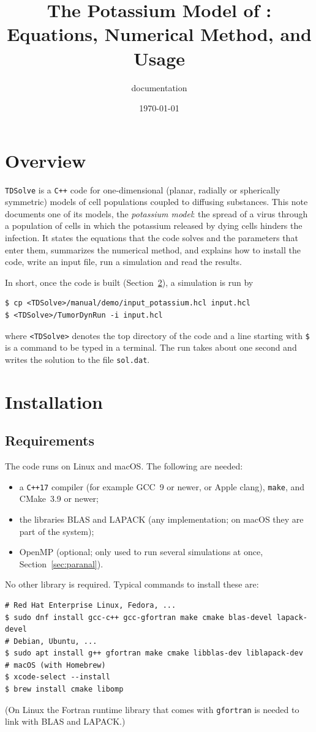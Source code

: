 \documentclass[11pt]{article}
\title{The Potassium Model of \code{TDSolve}:\\ Equations, Numerical Method, and Usage}
\author{\code{TDSolve} documentation}
\date{\today}
\newcommand{\code}[1]{\texttt{#1}}
\begin{document}
\maketitle

\section{Overview}
\code{TDSolve} is a \code{C++} code for one-dimensional (planar, radially or spherically symmetric) models of cell populations coupled to diffusing substances.
This note documents one of its models, the \emph{potassium model}: the spread of a virus through a population of cells in which the potassium released by dying cells hinders the infection.
It states the equations that the code solves and the parameters that enter them, summarizes the numerical method, and explains how to install the code, write an input file, run a simulation and read the results.

In short, once the code is built (Section~\ref{sec:install}), a simulation is run by
\begin{lstlisting}
$ cp <TDSolve>/manual/demo/input_potassium.hcl input.hcl
$ <TDSolve>/TumorDynRun -i input.hcl
\end{lstlisting}
where \code{<TDSolve>} denotes the top directory of the code and a line starting with \code{\$} is a command to be typed in a terminal.
The run takes about one second and writes the solution to the file \code{sol.dat}.

\section{Installation}
\label{sec:install}

\subsection{Requirements}
The code runs on Linux and macOS. The following are needed:
\begin{itemize}
  \item a \code{C++17} compiler (for example GCC~9 or newer, or Apple clang), \code{make}, and CMake~3.9 or newer;
  \item the libraries BLAS and LAPACK (any implementation; on macOS they are part of the system);
  \item OpenMP (optional; only used to run several simulations at once, Section~\ref{sec:paranal}).
\end{itemize}
No other library is required.
Typical commands to install these are:
\begin{lstlisting}
# Red Hat Enterprise Linux, Fedora, ...
$ sudo dnf install gcc-c++ gcc-gfortran make cmake blas-devel lapack-devel
# Debian, Ubuntu, ...
$ sudo apt install g++ gfortran make cmake libblas-dev liblapack-dev
# macOS (with Homebrew)
$ xcode-select --install
$ brew install cmake libomp
\end{lstlisting}
(On Linux the Fortran runtime library that comes with \code{gfortran} is needed to link with BLAS and LAPACK.)
\end{document}
